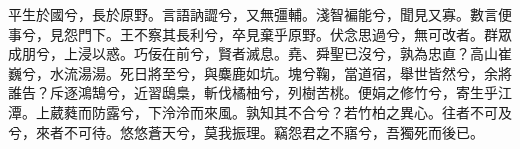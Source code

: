 
\begin{pinyinscope}
平生於國兮，長於原野。言語訥譅兮，又無彊輔。淺智褊能兮，聞見又寡。數言便事兮，見怨門下。王不察其長利兮，卒見棄乎原野。伏念思過兮，無可改者。群眾成朋兮，上浸以惑。巧佞在前兮，賢者滅息。堯、舜聖已沒兮，孰為忠直？高山崔巍兮，水流湯湯。死日將至兮，與麋鹿如坑。塊兮鞠，當道宿，舉世皆然兮，余將誰告？斥逐鴻鵠兮，近習鴟梟，斬伐橘柚兮，列樹苦桃。便娟之修竹兮，寄生乎江潭。上葳蕤而防露兮，下泠泠而來風。孰知其不合兮？若竹柏之異心。往者不可及兮，來者不可待。悠悠蒼天兮，莫我振理。竊怨君之不寤兮，吾獨死而後已。


\end{pinyinscope}